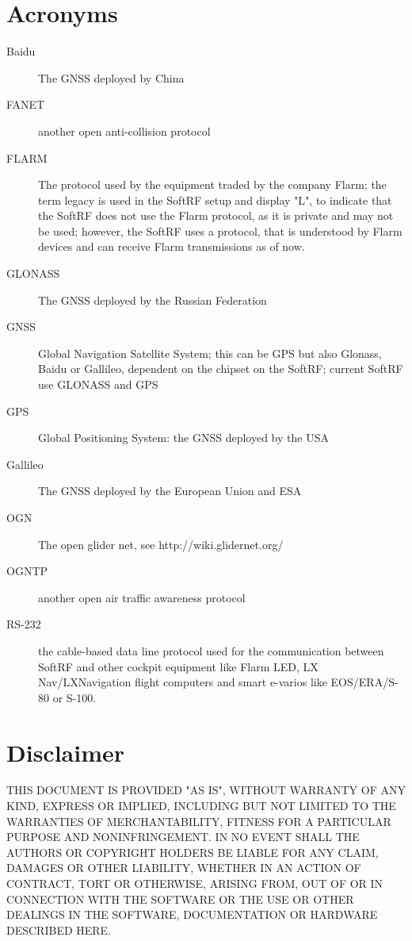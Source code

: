 \documentclass[11pt,a4paper]{article}
\begin{document}
\section{Acronyms}
\begin{description}
\item[Baidu] The GNSS deployed by China
\item[FANET] another open anti-collision protocol
\item[FLARM] The protocol used by the equipment traded by the company Flarm; the term legacy is used in the SoftRF setup and display "L", to indicate that the SoftRF does not use the Flarm protocol, as it is private and may not be used; however, the SoftRF uses a protocol, that is understood by Flarm devices and can receive Flarm transmissions as of now.
\item[GLONASS] The GNSS deployed by the Russian Federation
\item[GNSS] Global Navigation Satellite System; this can be GPS but also Glonass, Baidu or Gallileo, dependent on the chipset on the SoftRF; current SoftRF use GLONASS and GPS
\item[GPS] Global Positioning System: the GNSS deployed by the USA
\item[Gallileo] The GNSS deployed by the European Union and ESA
\item[OGN] The open glider net, see http://wiki.glidernet.org/
\item[OGNTP] another open air traffic awareness protocol
\item[RS-232] the cable-based data line protocol used for the communication between SoftRF and other cockpit equipment like Flarm LED, LX Nav/LXNavigation flight computers and smart e-varios like EOS/ERA/S-80 or S-100.
\end{description}

\section{Disclaimer}
THIS DOCUMENT IS PROVIDED "AS IS", WITHOUT WARRANTY OF ANY KIND, EXPRESS OR IMPLIED, INCLUDING BUT NOT LIMITED TO THE WARRANTIES OF MERCHANTABILITY, FITNESS FOR A PARTICULAR PURPOSE AND NONINFRINGEMENT. IN NO EVENT SHALL THE AUTHORS OR COPYRIGHT HOLDERS BE LIABLE FOR ANY CLAIM, DAMAGES OR OTHER LIABILITY, WHETHER IN AN ACTION OF CONTRACT, TORT OR OTHERWISE, ARISING FROM, OUT OF OR IN CONNECTION WITH THE SOFTWARE OR THE USE OR OTHER DEALINGS IN THE SOFTWARE, DOCUMENTATION OR HARDWARE DESCRIBED HERE.
\end{document}
